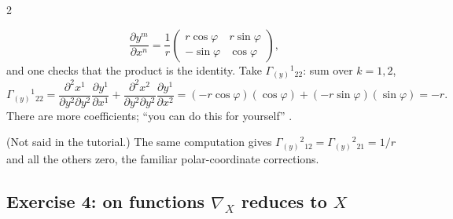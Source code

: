 \begin{paracol}{2}
\begin{enumerate}
        \[
          \frac{\partial y^m}{\partial x^n}=\frac1r\begin{pmatrix}r\cos\varphi&r\sin\varphi\\ -\sin\varphi&\cos\varphi\end{pmatrix},
        \]
        and one checks that the product is the identity. Take $\Gamma_{(y)}{}^1{}_{22}$: sum over $k=1,2$,
        \[
          \Gamma_{(y)}{}^1{}_{22}=\frac{\partial^2x^1}{\partial y^2\partial y^2}\frac{\partial y^1}{\partial x^1}+\frac{\partial^2x^2}{\partial y^2\partial y^2}\frac{\partial y^1}{\partial x^2}=(-r\cos\varphi)(\cos\varphi)+(-r\sin\varphi)(\sin\varphi)=-r.
        \]
        There are more coefficients; ``you can do this for yourself'' .
        \begin{coursenote}
        (Not said in the tutorial.) The same computation gives $\Gamma_{(y)}{}^2{}_{12}=\Gamma_{(y)}{}^2{}_{21}=1/r$ and all the others zero, the familiar polar-coordinate corrections.
        \end{coursenote}
\end{enumerate}

\subsection*{Exercise 4: on functions $\nabla_X$ reduces to $X$}


\end{paracol}
